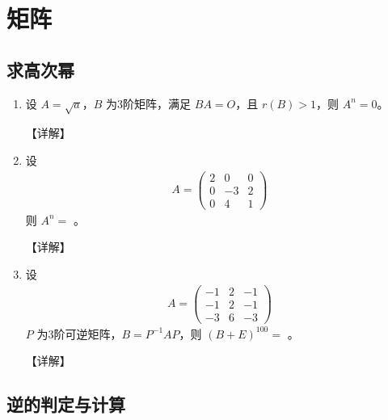 \documentclass[12pt, a4paper, oneside, UTF8]{ctexbook}
\begin{document}
% 
\else
\fi

\chapter{矩阵}
\section{求高次幂}

\begin{enumerate}[label=\arabic*.]
    \item 设 $ A = \sqrt{a} $，$ B $ 为3阶矩阵，满足 $ BA = O $，且 $ r(B) > 1 $，则 $ A^n = 0 $。
    
    \begin{solution}
    【详解】
    \end{solution}
    
    \item 设 
    \begin{align*}
    A = \begin{pmatrix}
    2 & 0 & 0 \\
    0 & -3 & 2 \\
    0 & 4 & 1
    \end{pmatrix}
    \end{align*}
    则 $ A^n = $ \underline{\hspace{3cm}}。
    
    \begin{solution}
    【详解】
    \end{solution}
    
    \item 设 
    \begin{align*}
    A = \begin{pmatrix}
    -1 & 2 & -1 \\
    -1 & 2 & -1 \\
    -3 & 6 & -3
    \end{pmatrix}
    \end{align*}
    $ P $ 为3阶可逆矩阵，$ B = P^{-1}AP $，则 $ (B + E)^{100} = $ \underline{\hspace{3cm}}。
    
    \begin{solution}
    【详解】
    \end{solution}
\end{enumerate}

\section{逆的判定与计算}
\end{document}
